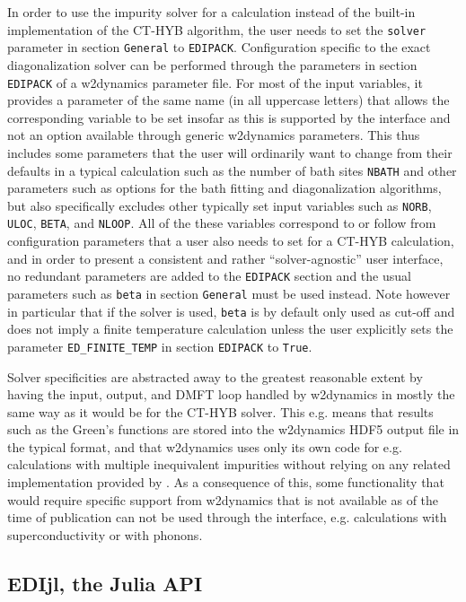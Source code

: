 \documentclass[edipack2.tex]{subfiles}
\begin{document}
In order to use the \NAME impurity solver for a calculation instead of the built-in implementation of the CT-HYB algorithm, the user needs to set the {\tt solver} parameter in section {\tt General} to {\tt   EDIPACK}. Configuration specific to the exact diagonalization solver can be performed through the parameters in section {\tt EDIPACK} of a w2dynamics parameter file. For most of the \NAME input variables, it provides a parameter of the same name (in all uppercase letters) that allows the corresponding variable to be set insofar as this is supported by the interface and not an option available through generic w2dynamics parameters. This thus includes some parameters that the user will ordinarily want to change from their defaults in a typical calculation such as the number of bath sites {\tt NBATH} and other parameters such as options for the bath fitting and diagonalization algorithms, but also specifically excludes other typically set input variables such as {\tt NORB}, {\tt ULOC}, {\tt BETA}, and {\tt   NLOOP}. All of the these variables correspond to or follow from configuration parameters that a user also needs to set for a CT-HYB calculation, and in order to present a consistent and rather ``solver-agnostic'' user interface, no redundant parameters are added to the {\tt EDIPACK} section and the usual parameters such as {\tt   beta} in section {\tt General} must be used instead. Note however in particular that if the \NAME solver is used, {\tt beta} is by default only used as cut-off and does not imply a finite temperature calculation unless the user explicitly sets the parameter {\tt   ED\_FINITE\_TEMP} in section {\tt EDIPACK} to {\tt True}.

Solver specificities are abstracted away to the greatest reasonable extent by having the input, output, and DMFT loop handled by w2dynamics in mostly the same way as it would be for the CT-HYB solver. This e.g. means that results such as the Green's functions are stored into the w2dynamics HDF5 output file in the typical format, and that w2dynamics uses only its own code for e.g. calculations with multiple inequivalent impurities without relying on any related implementation provided by \NAME{}. As a consequence of this, some functionality that would require specific support from w2dynamics that is not available as of the time of publication can not be used through the interface, e.g. calculations with superconductivity or with phonons.



\subsection{EDIjl, the Julia API}\label{sSecInteropEDIjl}
\end{document}

